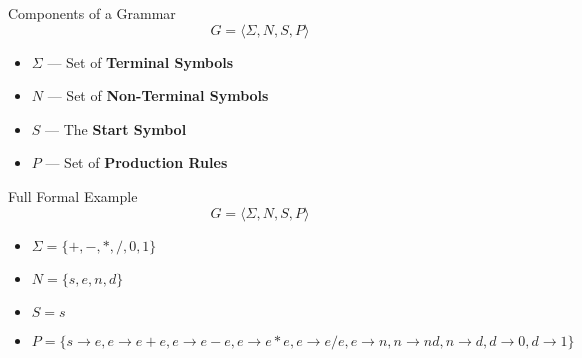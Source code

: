 \documentclass[]{beamer}
\newenvironment{code}{%
 \VerbatimEnvironment
 \begin{adjustbox}{max width=\textwidth, max height=0.7\textheight}
 \begin{BVerbatim}
  }{
  \end{BVerbatim}
 \end{adjustbox}
}
\begin{document}
\begin{frame}{Components of a Grammar}
    \[
    G = \langle \Sigma, N, S, P\rangle
    \]
    \begin{itemize}
        \item $\Sigma$ --- Set of {\bf Terminal Symbols}
        \item $N$ --- Set of {\bf Non-Terminal Symbols}
        \item $S$ --- The {\bf Start Symbol} 
        \item $P$ --- Set of {\bf Production Rules}
    \end{itemize}
\end{frame}

\begin{frame}{Full Formal Example}
    \[
    G = \langle \Sigma, N, S, P \rangle
    \]
    \begin{itemize}
        \item $\Sigma=\{+,-,*,/,0,1\}$
        \item $N=\{s,e,n,d\}$
        \item $S=s$
        \item $P=\{ s \rightarrow e, e \rightarrow e + e, e \rightarrow e - e, e \rightarrow e * e,%
                    e \rightarrow e / e,e \rightarrow n,n \rightarrow nd,n \rightarrow d,%
                    d \rightarrow 0, d \rightarrow 1\}$
    \end{itemize}
\end{frame}

\end{document}
